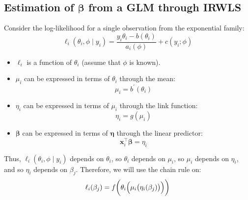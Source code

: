 \documentclass[oneside]{book}\usepackage[]{graphicx}\usepackage[svgnames]{xcolor}
\providecommand{\Vector}[1]{\bm{#1}}%
\begin{document}
\subsection*{Estimation of $ \Vector{\beta} $ from a GLM through IRWLS}
Consider the log-likelihood for a single observation from the exponential family:
\[ \ell_i(\theta_i,\phi\mid y_i)=\frac{y_i\theta_i-b(\theta_i)}{a_i(\phi)}+c(y_i;\phi) \]
\begin{itemize}
    \item $ \ell_i $ is a function of $ \theta_i $ (assume that $ \phi $ is known).
    \item $ \mu_i $ can be expressed in terms of $ \theta_i $ through the mean:
          \[ \mu_i=b^\prime(\theta_i) \]
    \item $ \eta_i $ can be expressed in terms of $ \mu_i $ through the link function:
          \[ \eta_i=g(\mu_i) \]
    \item $ \Vector{\beta} $ can be expressed in terms of $ \Vector{\eta} $ through the linear predictor:
          \[ \Vector{x}_i^\top \Vector{\beta}=\eta_i \]
\end{itemize}
Thus, $ \ell_i(\theta_i,\phi\mid y_i) $ depends on $ \theta_i $, so $ \theta_i $ depends on $ \mu_i $, so $ \mu_i $ depends on $ \eta_i $, and so $ \eta_i $ depends on $ \beta_j $.
Therefore, we will use the chain rule on:
\[ \ell_i(\beta_j)=f\biggr(\theta_i\Bigl(\mu_i\bigl(\eta_i(\beta_j)\bigr)\Bigr)\biggr) \]
\end{document}
